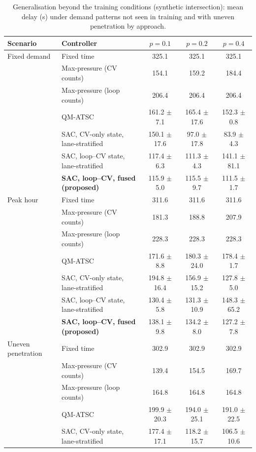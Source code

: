 \begin{table}[t]
\centering
\caption{Generalisation beyond the training conditions (synthetic intersection): mean delay (s) under demand patterns not seen in training and with uneven penetration by approach.}
\label{tab:scenarios}
\scriptsize
\setlength{\tabcolsep}{3pt}
\begin{tabular}{@{}llccc@{}}
\toprule
Scenario & Controller & $p=0.1$ & $p=0.2$ & $p=0.4$\\
\midrule
Fixed demand & Fixed time & 325.1 & 325.1 & 325.1\\
 & Max-pressure (CV counts) & 154.1 & 159.2 & 184.4\\
 & Max-pressure (loop counts) & 206.4 & 206.4 & 206.4\\
 & QM-ATSC \citep{fu2026} & 161.2 $\pm$ 7.1 & 165.4 $\pm$ 17.6 & 152.3 $\pm$ 0.8\\
 & SAC, CV-only state, lane-stratified & 150.1 $\pm$ 17.6 & 97.0 $\pm$ 17.8 & 83.9 $\pm$ 4.3\\
 & SAC, loop--CV state, lane-stratified & 117.4 $\pm$ 6.3 & 111.3 $\pm$ 4.3 & 141.1 $\pm$ 81.1\\
 & \textbf{SAC, loop--CV, fused (proposed)} & 115.9 $\pm$ 5.0 & 115.5 $\pm$ 9.7 & 111.5 $\pm$ 1.7\\
\midrule
Peak hour & Fixed time & 311.6 & 311.6 & 311.6\\
 & Max-pressure (CV counts) & 181.3 & 188.8 & 207.9\\
 & Max-pressure (loop counts) & 228.3 & 228.3 & 228.3\\
 & QM-ATSC \citep{fu2026} & 171.6 $\pm$ 8.8 & 180.3 $\pm$ 24.0 & 178.4 $\pm$ 1.7\\
 & SAC, CV-only state, lane-stratified & 194.8 $\pm$ 16.4 & 156.9 $\pm$ 15.2 & 127.8 $\pm$ 5.0\\
 & SAC, loop--CV state, lane-stratified & 130.4 $\pm$ 5.8 & 131.3 $\pm$ 10.9 & 148.3 $\pm$ 65.2\\
 & \textbf{SAC, loop--CV, fused (proposed)} & 138.1 $\pm$ 9.8 & 134.2 $\pm$ 8.0 & 127.2 $\pm$ 7.8\\
\midrule
Uneven penetration & Fixed time & 302.9 & 302.9 & 302.9\\
 & Max-pressure (CV counts) & 139.4 & 154.5 & 169.7\\
 & Max-pressure (loop counts) & 164.8 & 164.8 & 164.8\\
 & QM-ATSC \citep{fu2026} & 199.9 $\pm$ 20.3 & 194.0 $\pm$ 25.1 & 191.0 $\pm$ 22.5\\
 & SAC, CV-only state, lane-stratified & 177.4 $\pm$ 17.1 & 118.2 $\pm$ 15.7 & 106.5 $\pm$ 10.6\\
\bottomrule
\end{tabular}
\end{table}
